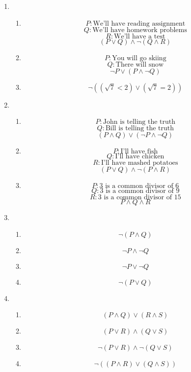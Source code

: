 \begin{enumerate}
    \item
    \begin{enumerate}
        \item
        \[P:\text{We’ll have reading assignment}\]
        \[Q:\text{We’ll have homework problems}\]
        \[R:\text{We’ll have a test}\]
        \[(P \lor Q) \land \lnot (Q \land R) \]
        \item 
        \[P: \text{You will go skiing}\]
        \[Q: \text{There will snow}\]
        \[\lnot P \lor (P \land \lnot Q)\]
        \item
        \[\lnot ((\sqrt{7} < 2) \lor (\sqrt{7} = 2))\]
    \end{enumerate}
    \item
    \begin{enumerate}
        \item
        \[P: \text{John is telling the truth}\]
        \[Q: \text{Bill is telling the truth}\]
        \[(P \land Q) \lor (\lnot P \land \lnot Q)\]
        \item
        \[P: \text{I'll have fish}\]
        \[Q: \text{I'll have chicken}\]
        \[R: \text{I'll have mashed potatoes}\]
        \[(P \lor Q) \land \lnot (P \land R)\]
        \item
        \[P: 3 \text{ is a common divisor of } 6\]
        \[Q: 3 \text{ is a common divisor of } 9\]
        \[R: 3 \text{ is a common divisor of } 15\]
        \[P \land Q \land R\]
    \end{enumerate}
    \item
    \begin{enumerate}
        \item
        \[\lnot (P \land Q)\]
        \item
        \[\lnot P \land \lnot Q\]
        \item 
        \[\lnot P \lor \lnot Q\]
        \item 
        \[\lnot(P \lor Q)\]
    \end{enumerate}
    \item 
    \begin{enumerate}
        \item
        \[(P \land Q) \lor (R \land S)\]
        \item 
        \[(P \lor R) \land (Q \lor S)\]
        \item 
        \[\lnot(P \lor R) \land \lnot(Q \lor S)\]
        \item 
        \[\lnot((P \land R) \lor (Q \land S))\]

\end{enumerate}
\end{enumerate}
